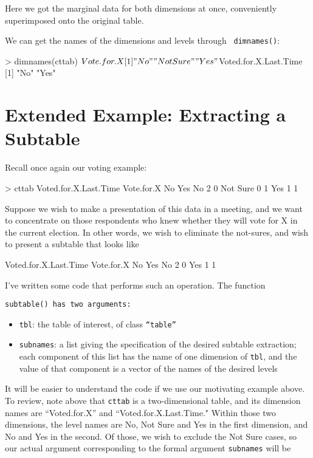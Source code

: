 \noindent
Here we got the marginal data for both dimensions at once, conveniently
superimposed onto the original table.

We can get the names of the dimensions and levels through {\tt
dimnames()}:

\begin{Code}
> dimnames(cttab)
$Vote.for.X
[1] "No"       "Not Sure" "Yes"     

$Voted.for.X.Last.Time
[1] "No"  "Yes"
\end{Code}

\section{Extended Example:  Extracting a Subtable}
\label{subtable}

Recall once again our voting example:

\begin{Code}
> cttab
          Voted.for.X.Last.Time
Vote.for.X No Yes
  No        2   0
  Not Sure  0   1
  Yes       1   1
\end{Code}

\noindent
Suppose we wish to make a presentation of this data in a meeting,
and we want to concentrate on those respondents who knew whether they 
will vote for X in the current election.  In other words, we wish to
eliminate the not-sures, and wish to present a subtable that looks like

\begin{Code}
          Voted.for.X.Last.Time
Vote.for.X No Yes
  No        2   0
  Yes       1   1
\end{Code}

\noindent
I've written some code that performs such an operation.  The function
{\tt subtable() has two arguments:

\begin{itemize}

\item {\tt tbl}: the table of interest, of class {\tt ``table''}

\item {\tt subnames}: a list giving the specification of the desired
subtable extraction; each component of this list has the name
of one dimension of {\tt tbl}, and the value of that component 
is a vector of the names of the desired levels

\end{itemize}}

It will be easier to understand the code if we use our motivating
example above.  To review, note above that {\tt cttab} is a
two-dimensional table, and its dimension names are ``Voted.for.X'' and
``Voted.for.X.Last.Time."  Within those two dimensions, the level names
are No, Not Sure and Yes in the first dimension, and No and Yes in the
second.  Of those, we wish to exclude the Not Sure cases, so our actual
argument corresponding to the formal argument {\tt subnames} will be 

